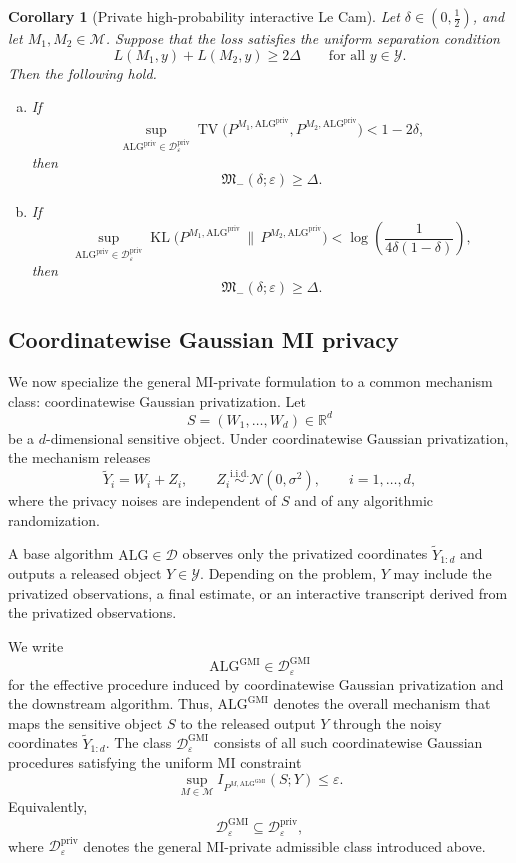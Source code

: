 \documentclass[journal]{IEEEtran}
\newtheorem{corollary}{Corollary}
\newcommand{\ALG}{\mathrm{ALG}}
\newcommand{\TV}{\operatorname{TV}}
\newcommand{\KL}{\operatorname{KL}}
\begin{document}
\begin{corollary}[Private high-probability interactive Le Cam]
\label{cor:private-hp-lecam}
Let \(\delta\in(0,\tfrac12)\), and let \(M_1,M_2\in\mathcal M\). Suppose that
the loss satisfies the uniform separation condition
\[
L(M_1,y)+L(M_2,y)\ge 2\Delta
\qquad
\text{for all }y\in\mathcal Y.
\]
Then the following hold.
\begin{enumerate}[(a)]
    \item If
    \[
    \sup_{\ALG^{\mathrm{priv}}\in\mathcal D_\varepsilon^{\mathrm{priv}}}
    \TV\bigl(
    P^{M_1,\ALG^{\mathrm{priv}}},
    P^{M_2,\ALG^{\mathrm{priv}}}
    \bigr)
    <1-2\delta,
    \]
    then
    \[
    \mathfrak M_-(\delta;\varepsilon)\ge \Delta.
    \]

    \item If
    \[
    \sup_{\ALG^{\mathrm{priv}}\in\mathcal D_\varepsilon^{\mathrm{priv}}}
    \KL\bigl(
    P^{M_1,\ALG^{\mathrm{priv}}}
    \,\|\,
    P^{M_2,\ALG^{\mathrm{priv}}}
    \bigr)
    <
    \log\!\left(\frac{1}{4\delta(1-\delta)}\right),
    \]
    then
    \[
    \mathfrak M_-(\delta;\varepsilon)\ge \Delta.
    \]
\end{enumerate}
\end{corollary}





\subsection{Coordinatewise Gaussian MI privacy}

We now specialize the general MI-private formulation to a common
mechanism class: coordinatewise Gaussian privatization. Let
\[
S=(W_1,\dots,W_d)\in\mathbb R^d
\]
be a \(d\)-dimensional sensitive object. Under coordinatewise Gaussian
privatization, the mechanism releases
\[
\widetilde Y_i=W_i+Z_i,
\qquad
Z_i\stackrel{\mathrm{i.i.d.}}{\sim}\mathcal N(0,\sigma^2),
\qquad
i=1,\dots,d,
\]
where the privacy noises are independent of \(S\) and of any algorithmic
randomization.

A base algorithm \(\ALG\in\mathcal D\) observes only the privatized
coordinates \(\widetilde Y_{1:d}\) and outputs a released object
\(Y\in\mathcal Y\). Depending on the problem, \(Y\) may include the
privatized observations, a final estimate, or an interactive transcript
derived from the privatized observations.

We write
\[
\ALG^{\mathrm{GMI}}\in\mathcal D_\varepsilon^{\mathrm{GMI}}
\]
for the effective procedure induced by coordinatewise Gaussian
privatization and the downstream algorithm. Thus,
\(\ALG^{\mathrm{GMI}}\) denotes the overall mechanism that maps the
sensitive object \(S\) to the released output \(Y\) through the noisy
coordinates \(\widetilde Y_{1:d}\). The class
\(\mathcal D_\varepsilon^{\mathrm{GMI}}\) consists of all such
coordinatewise Gaussian procedures satisfying the uniform MI constraint
\[
\sup_{M\in\mathcal M}
I_{P^{M,\ALG^{\mathrm{GMI}}}}(S;Y)
\le \varepsilon .
\]
Equivalently,
\[
\mathcal D_\varepsilon^{\mathrm{GMI}}
\subseteq
\mathcal D_\varepsilon^{\mathrm{priv}},
\]
where \(\mathcal D_\varepsilon^{\mathrm{priv}}\) denotes the general
MI-private admissible class introduced above.
\end{document}
